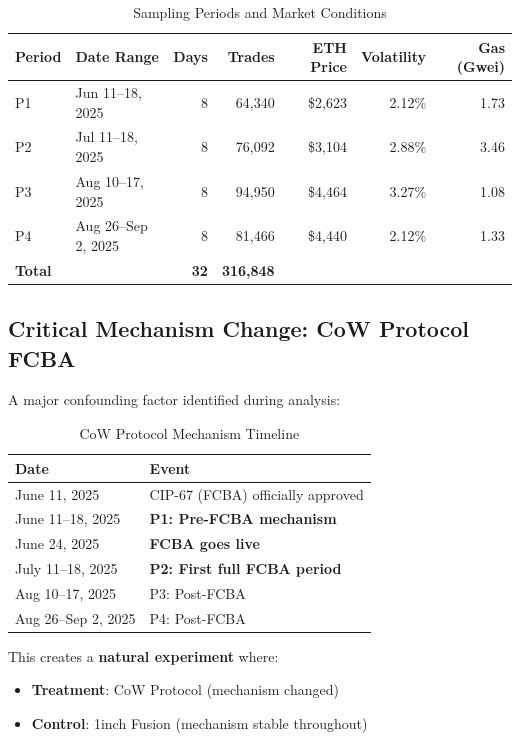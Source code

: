 \documentclass[11pt,a4paper]{article}
\begin{document}
\begin{table}[H]
\centering
\caption{Sampling Periods and Market Conditions}
\begin{tabular}{llrrrrr}
\toprule
\textbf{Period} & \textbf{Date Range} & \textbf{Days} & \textbf{Trades} & \textbf{ETH Price} & \textbf{Volatility} & \textbf{Gas (Gwei)} \\
\midrule
P1 & Jun 11--18, 2025 & 8 & 64,340 & \$2,623 & 2.12\% & 1.73 \\
P2 & Jul 11--18, 2025 & 8 & 76,092 & \$3,104 & 2.88\% & 3.46 \\
P3 & Aug 10--17, 2025 & 8 & 94,950 & \$4,464 & 3.27\% & 1.08 \\
P4 & Aug 26--Sep 2, 2025 & 8 & 81,466 & \$4,440 & 2.12\% & 1.33 \\
\midrule
\textbf{Total} & & \textbf{32} & \textbf{316,848} & & & \\
\bottomrule
\end{tabular}
\end{table}

\subsection{Critical Mechanism Change: CoW Protocol FCBA}

A major confounding factor identified during analysis:

\begin{table}[H]
\centering
\caption{CoW Protocol Mechanism Timeline}
\begin{tabular}{ll}
\toprule
\textbf{Date} & \textbf{Event} \\
\midrule
June 11, 2025 & CIP-67 (FCBA) officially approved \\
June 11--18, 2025 & \textbf{P1: Pre-FCBA mechanism} \\
June 24, 2025 & \textbf{FCBA goes live} \\
July 11--18, 2025 & \textbf{P2: First full FCBA period} \\
Aug 10--17, 2025 & P3: Post-FCBA \\
Aug 26--Sep 2, 2025 & P4: Post-FCBA \\
\bottomrule
\end{tabular}
\end{table}

This creates a \textbf{natural experiment} where:
\begin{itemize}
    \item \textbf{Treatment}: CoW Protocol (mechanism changed)
    \item \textbf{Control}: 1inch Fusion (mechanism stable throughout)
\end{itemize}
\end{document}
